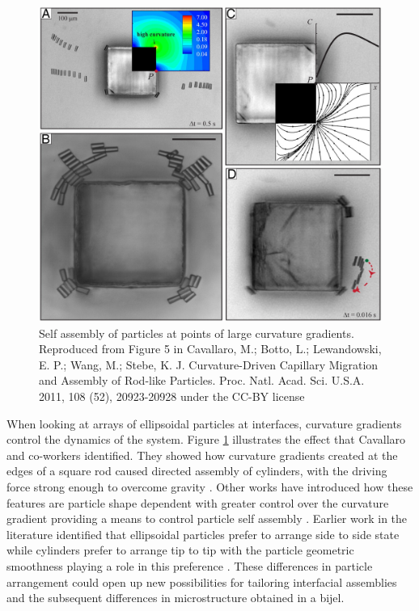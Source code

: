 \begin{figure}
    \centering
    \includegraphics[scale = 0.3]{../figures/literature_review/curvature_driven_assembly.jpeg}
    \caption{Self assembly of particles at points of large curvature gradients. Reproduced from Figure 5 in Cavallaro, M.; Botto, L.; 
             Lewandowski, E. P.; Wang, M.; Stebe, K. J. Curvature-Driven Capillary Migration and Assembly of Rod-like Particles. 
             Proc. Natl. Acad. Sci. U.S.A. 2011, 108 (52), 20923-20928 under the CC-BY license}
    \label{fig:curvature_gradient}
\end{figure}

When looking at arrays of ellipsoidal particles at interfaces, curvature gradients control the dynamics of the system. Figure \ref{fig:curvature_gradient} illustrates the effect that
Cavallaro and co-workers identified. They showed how curvature gradients created at the edges of a 
square rod caused directed assembly of cylinders, with the driving force strong enough to overcome gravity \cite{cavallaro_curvature-driven_2011}. Other works have introduced how these features are 
particle shape dependent with greater control over the curvature gradient providing a means to control particle self assembly \cite{read_dimerization_2020, sharifi-mood_curvature_2015}.
Earlier work in the literature identified that ellipsoidal particles prefer to arrange side to side state while cylinders prefer to arrange tip to tip with the particle geometric smoothness playing 
a role in this preference \cite{botto_capillary_2012}. These differences in particle arrangement could open up new possibilities for tailoring interfacial assemblies and the subsequent differences 
in microstructure obtained in a bijel.


